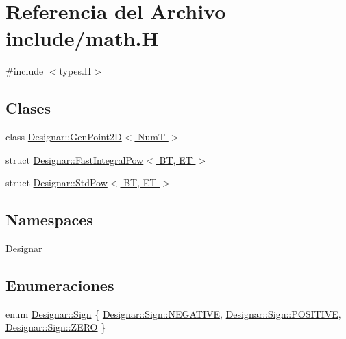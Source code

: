 \hypertarget{math_8_h}{}\section{Referencia del Archivo include/math.H}
\label{math_8_h}
{\ttfamily \#include $<$types.\+H$>$}\newline
\subsection*{Clases}
\begin{DoxyCompactItemize}
\item 
class \hyperlink{class_designar_1_1_gen_point2_d}{Designar\+::\+Gen\+Point2\+D$<$ Num\+T $>$}
\item 
struct \hyperlink{struct_designar_1_1_fast_integral_pow}{Designar\+::\+Fast\+Integral\+Pow$<$ B\+T, E\+T $>$}
\item 
struct \hyperlink{struct_designar_1_1_std_pow}{Designar\+::\+Std\+Pow$<$ B\+T, E\+T $>$}
\end{DoxyCompactItemize}
\subsection*{Namespaces}
\begin{DoxyCompactItemize}
\item 
 \hyperlink{namespace_designar}{Designar}
\end{DoxyCompactItemize}
\subsection*{Enumeraciones}
\begin{DoxyCompactItemize}
\item 
enum \hyperlink{namespace_designar_aee82690b26e153ff9bcb37b8144b83f4}{Designar\+::\+Sign} \{ \hyperlink{namespace_designar_aee82690b26e153ff9bcb37b8144b83f4a50546bf973283065b6ccf09faf7a580a}{Designar\+::\+Sign\+::\+N\+E\+G\+A\+T\+I\+VE}, 
\hyperlink{namespace_designar_aee82690b26e153ff9bcb37b8144b83f4aab6c31432785221bae58327ef5f6ea58}{Designar\+::\+Sign\+::\+P\+O\+S\+I\+T\+I\+VE}, 
\hyperlink{namespace_designar_aee82690b26e153ff9bcb37b8144b83f4a529e9e0beb5f85d1f132917c1a09860c}{Designar\+::\+Sign\+::\+Z\+E\+RO}
 \}
\end{DoxyCompactItemize}
